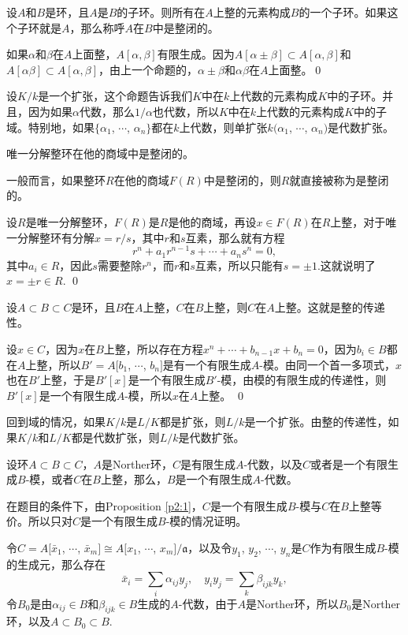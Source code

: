 \para 设$A$和$B$是环，且$A$是$B$的子环。则所有在$A$上整的元素构成$B$的一个子环。如果这个子环就是$A$，那么称呼$A$在$B$中是整闭的。

\proof 如果$\alpha$和$\beta$在$A$上面整，$A[\alpha,\beta]$有限生成。因为$A[\alpha\pm\beta]\subset A[\alpha,\beta]$和$A[\alpha\beta]\subset A[\alpha,\beta]$，由上一个命题的，$\alpha\pm\beta$和$\alpha\beta$在$A$上面整。\qed

设$K/k$是一个扩张，这个命题告诉我们$K$中在$k$上代数的元素构成$K$中的子环。并且，因为如果$\alpha$代数，那么$1/\alpha$也代数，所以$K$中在$k$上代数的元素构成$K$中的子域。特别地，如果$\{\alpha_1$, $\cdots$, $\alpha_n\}$都在$k$上代数，则单扩张$k(\alpha_1$, $\cdots$, $\alpha_n)$是代数扩张。

\para 唯一分解整环在他的商域中是整闭的。

一般而言，如果整环$R$在他的商域$F(R)$中是整闭的，则$R$就直接被称为是整闭的。

\proof 
	设$R$是唯一分解整环，$F(R)$是$R$是他的商域，再设$x\in F(R)$在$R$上整，对于唯一分解整环有分解$x=r/s$，其中$r$和$s$互素，那么就有方程
	\[
		r^n+a_1r^{n-1}s+\cdots+a_n s^n=0,
	\]
	其中$a_i\in R$，因此$s$需要整除$r^n$，而$r$和$s$互素，所以只能有$s=\pm 1$.这就说明了$x=\pm r\in R$.
\qed

\pro 设$A\subset B\subset C$是环，且$B$在$A$上整，$C$在$B$上整，则$C$在$A$上整。这就是整的传递性。

\proof 
	设$x\in C$，因为$x$在$B$上整，所以存在方程$x^n+\cdots+b_{n-1}x+b_n=0$，因为$b_i\in B$都在$A$上整，所以$B'=A[b_1$, $\cdots$, $b_n]$是有一个有限生成$A$-模。由同一个首一多项式，$x$也在$B'$上整，于是$B'[x]$是一个有限生成$B'$-模，由模的有限生成的传递性，则$B'[x]$是一个有限生成$A$-模，所以$x$在$A$上整。
\qed

回到域的情况，如果$K/k$是$L/K$都是扩张，则$L/k$是一个扩张。由整的传递性，如果$K/k$和$L/K$都是代数扩张，则$L/k$是代数扩张。

\pro 设环$A\subset B\subset C$，$A$是Norther环，$C$是有限生成$A$-代数，以及$C$或者是一个有限生成$B$-模，或者$C$在$B$上整，那么，$B$是一个有限生成$A$-代数。
	\label{p:2.4}

\proof 
	在题目的条件下，由Proposition \eqref{p2:1}，$C$是一个有限生成$B$-模与$C$在$B$上整等价。所以只对$C$是一个有限生成$B$-模的情况证明。

	令$C=A[\bar{x}_1$, $\cdots$, $\bar{x}_m]\cong A[x_1$, $\cdots$, $x_m]/\mathfrak{a}$，以及令$y_1$, $y_2$, $\cdots$, $y_n$是$C$作为有限生成$B$-模的生成元，那么存在
	\begin{equation}
		\bar{x}_i=\sum_i\alpha_{ij}y_j,\quad y_iy_j=\sum_{k}\beta_{ijk}y_k,
	\end{equation}
	令$B_0$是由$\alpha_{ij}\in B$和$\beta_{ijk}\in B$生成的$A$-代数，由于$A$是Norther环，所以$B_0$是Norther环，以及$A\subset B_0 \subset B$.

